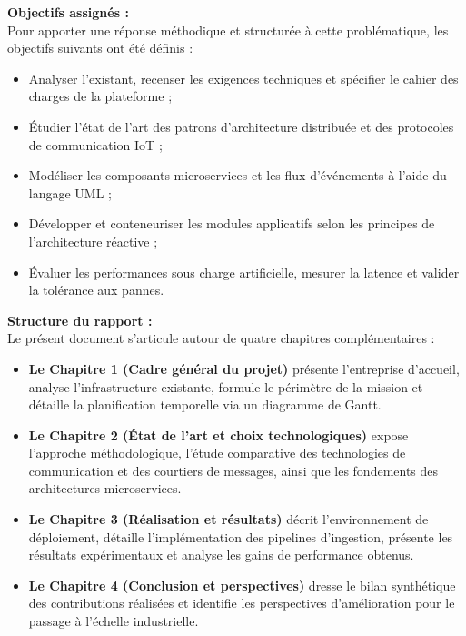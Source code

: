 \noindent
\textbf{Objectifs assign\'es :}\\
Pour apporter une r\'eponse m\'ethodique et structur\'ee \`a cette probl\'ematique, les objectifs suivants ont \'et\'e d\'efinis :
\begin{itemize}
    \item Analyser l'existant, recenser les exigences techniques et sp\'ecifier le cahier des charges de la plateforme ;
    \item \'Etudier l'\'etat de l'art des patrons d'architecture distribu\'ee et des protocoles de communication IoT ;
    \item Mod\'eliser les composants microservices et les flux d'\'ev\'enements \`a l'aide du langage UML ;
    \item D\'evelopper et conteneuriser les modules applicatifs selon les principes de l'architecture r\'eactive ;
    \item \'Evaluer les performances sous charge artificielle, mesurer la latence et valider la tol\'erance aux pannes.
\end{itemize}

\vspace{0.4cm}

\noindent
\textbf{Structure du rapport :}\\
Le pr\'esent document s'articule autour de quatre chapitres compl\'ementaires :
\begin{itemize}
    \item \textbf{Le Chapitre 1 (Cadre g\'en\'eral du projet)} pr\'esente l'entreprise d'accueil, analyse l'infrastructure existante, formule le p\'erim\`etre de la mission et d\'etaille la planification temporelle via un diagramme de Gantt.
    \item \textbf{Le Chapitre 2 (\'Etat de l'art et choix technologiques)} expose l'approche m\'ethodologique, l'\'etude comparative des technologies de communication et des courtiers de messages, ainsi que les fondements des architectures microservices.
    \item \textbf{Le Chapitre 3 (R\'ealisation et r\'esultats)} d\'ecrit l'environnement de d\'eploiement, d\'etaille l'impl\'ementation des pipelines d'ingestion, pr\'esente les r\'esultats exp\'erimentaux et analyse les gains de performance obtenus.
    \item \textbf{Le Chapitre 4 (Conclusion et perspectives)} dresse le bilan synth\'etique des contributions r\'ealis\'ees et identifie les perspectives d'am\'elioration pour le passage \`a l'\'echelle industrielle.
\end{itemize}
